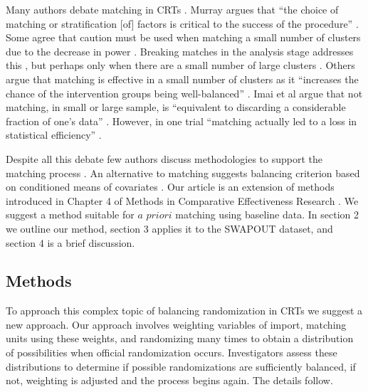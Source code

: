 \documentclass[]{sagej}
\begin{document}
Many authors debate matching in CRTs
\citep{balzer2012match, CRTrials2009, gatsonis2017methods, diehr1995breaking, murray1998design, imai2009essential, PMVsStrat, donner2007merits, klar1997merits, donner2000design, martin1993effect}.
Murray argues that ``the choice of matching or stratification {[}of{]}
factors is critical to the success of the procedure''
\citep{murray1998design}. Some agree that caution must be used when
matching a small number of clusters due to the decrease in power
\citep{donner2000design, klar1997merits, balzer2012match, martin1993effect}.
Breaking matches in the analysis stage addresses this
\citep{diehr1995breaking}, but perhaps only when there are a small
number of large clusters \citep{donner2007merits}. Others argue that
matching is effective in a small number of clusters as it ``increases
the chance of the intervention groups being well-balanced''
\citep{donner2007merits}. Imai et al argue that not matching, in small
or large sample, is ``equivalent to discarding a considerable fraction
of one's data'' \citep{imai2009essential}. However, in one trial
``matching actually led to a loss in statistical efficiency''
\citep[\citet{donner2000design}]{manun1994influence}.

Despite all this debate few authors discuss methodologies to support the
matching process \citep{raab2001balance}. An alternative to matching
suggests balancing criterion based on conditioned means of covariates
\citep{raab2001balance}. Our article is an extension of methods
introduced in Chapter 4 of Methods in Comparative Effectiveness Research
\citep{gatsonis2017methods}. We suggest a method suitable for \(a\)
\(priori\) matching using baseline data. In section 2 we outline our
method, section 3 applies it to the SWAPOUT dataset, and section 4 is a
brief discussion.

\subsection{Methods }\label{methods}

To approach this complex topic of balancing randomization in CRTs we
suggest a new approach. Our approach involves weighting variables of
import, matching units using these weights, and randomizing many times
to obtain a distribution of possibilities when official randomization
occurs. Investigators assess these distributions to determine if
possible randomizations are sufficiently balanced, if not, weighting is
adjusted and the process begins again. The details follow.
\end{document}
